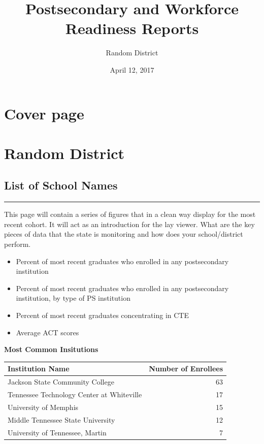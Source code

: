 \documentclass[11pt,]{article}
\title{Postsecondary and Workforce Readiness Reports}
\subtitle{Random District}
\author{}
\date{April 12, 2017}
\providecommand{\tightlist}{%
  \setlength{\itemsep}{0pt}\setlength{\parskip}{0pt}}
\begin{document}
\maketitle

\section{Cover page}\label{cover-page}

\section{Random District}\label{random-district}

\subsection{List of School Names}\label{list-of-school-names}

\begin{center}\rule{0.5\linewidth}{\linethickness}\end{center}

This page will contain a series of figures that in a clean way display
for the most recent cohort. It will act as an introduction for the lay
viewer. What are the key pieces of data that the state is monitoring and
how does your school/district perform.

\begin{itemize}
\tightlist
\item
  Percent of most recent graduates who enrolled in any postsecondary
  institution
\item
  Percent of most recent graduates who enrolled in any postsecondary
  institution, by type of PS institution
\item
  Percent of most recent graduates concentrating in CTE
\item
  Average ACT scores 
\end{itemize}

\textbf{Most Common Insitutions}

\begin{longtable}[]{@{}lr@{}}
\toprule
Institution Name & Number of Enrollees\tabularnewline
\midrule
\endhead
Jackson State Community College & 63\tabularnewline
Tennessee Technology Center at Whiteville & 17\tabularnewline
University of Memphis & 15\tabularnewline
Middle Tennessee State University & 12\tabularnewline
University of Tennessee, Martin & 7\tabularnewline
\bottomrule
\end{longtable}
\end{document}
